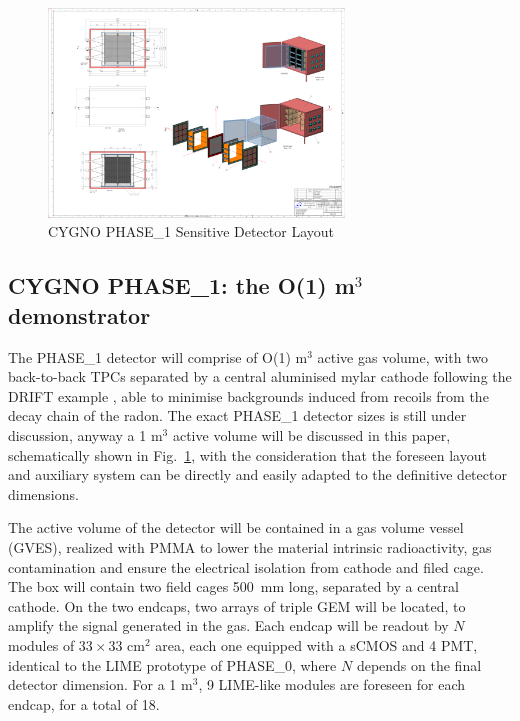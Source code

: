 \documentclass[physics,article,submit,moreauthors,pdftex]{Definitions/mdpi}
\begin{document}
\begin{figure}[!t]
\centering
 \includegraphics[width=0.7\textwidth]{CygnoDetector.pdf}
 \caption{CYGNO PHASE\_1 Sensitive Detector Layout}
 \label{fig:detector}
 \end{figure}
 
\subsection{CYGNO PHASE\_1: the O(1) m$^3$ demonstrator}\label{sec:phase1}
The PHASE\_1 detector will comprise of  O(1) m$^3$ active gas volume, with two back-to-back TPCs separated by a central aluminised mylar cathode following the DRIFT example \cite{Battat:2015rna}, able to minimise backgrounds induced from recoils from the decay chain of the radon. 
The exact PHASE\_1 detector sizes is still under discussion, anyway a 1 m$^3$ active volume will be discussed in this paper, schematically shown in Fig.~\ref{fig:detector},
with the consideration that the foreseen layout and auxiliary system can be directly and easily adapted to the definitive detector dimensions.

The active volume of the detector will be contained in a gas volume vessel (GVES), realized with PMMA to lower the material intrinsic radioactivity, gas contamination and ensure the electrical isolation from cathode and filed cage. 
The box will contain two field cages 500~mm long, separated by a central cathode. On the two endcaps, two arrays of triple GEM will be located, to amplify the signal generated in the gas. Each endcap will be readout by $N$ modules of $33 \times 33$ cm$^2$  area, each one equipped with a sCMOS and 4 PMT, identical to the LIME prototype of PHASE\_0, where $N$ depends on the final detector dimension. For a 1 m$^3$, 9 LIME-like modules are foreseen for each endcap, for a total of 18.
\end{document}
